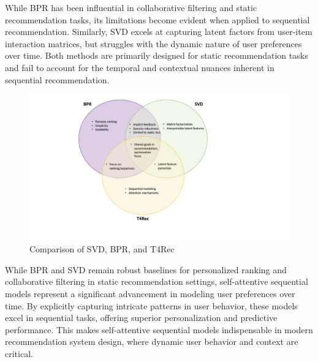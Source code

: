 \documentclass{article}
\begin{document}
While BPR has been influential in collaborative filtering and static recommendation tasks, its limitations become evident when applied to sequential recommendation. Similarly, SVD excels at capturing latent factors from user-item interaction matrices, but struggles with the dynamic nature of user preferences over time. Both methods are primarily designed for static recommendation tasks and fail to account for the temporal and contextual nuances inherent in sequential recommendation.

\begin{figure}
    \centering
    \includegraphics[width=1.1\linewidth]{images/SOTA_compare.png}
    \caption{Comparison of SVD, BPR, and T4Rec}
    \label{fig:mf}
\end{figure}
While BPR and SVD remain robust baselines for personalized ranking and collaborative filtering in static recommendation settings, self-attentive sequential models represent a significant advancement in modeling user preferences over time. By explicitly capturing intricate patterns in user behavior, these models excel in sequential tasks, offering superior personalization and predictive performance. This makes self-attentive sequential models indispensable in modern recommendation system design, where dynamic user behavior and context are critical.

\end{document}
